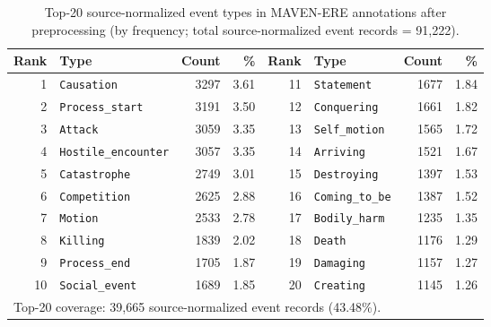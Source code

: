 \documentclass{article}
\begin{document}
\begin{table}[t]
\centering
\caption{Top-20 source-normalized event types in MAVEN-ERE annotations after preprocessing (by frequency; total source-normalized event records = 91{,}222).}
\label{tab:app_mavenere_top20_event_types}
\small
\begin{adjustbox}{max width=\linewidth}
\begin{tabular}{r l r r | r l r r}
\hline
Rank & Type & Count & \% & Rank & Type & Count & \% \\
\hline
1  & \texttt{Causation}            & 3297 & 3.61 & 11 & \texttt{Statement}            & 1677 & 1.84 \\
2  & \texttt{Process\_start}       & 3191 & 3.50 & 12 & \texttt{Conquering}           & 1661 & 1.82 \\
3  & \texttt{Attack}               & 3059 & 3.35 & 13 & \texttt{Self\_motion}         & 1565 & 1.72 \\
4  & \texttt{Hostile\_encounter}   & 3057 & 3.35 & 14 & \texttt{Arriving}             & 1521 & 1.67 \\
5  & \texttt{Catastrophe}          & 2749 & 3.01 & 15 & \texttt{Destroying}           & 1397 & 1.53 \\
6  & \texttt{Competition}          & 2625 & 2.88 & 16 & \texttt{Coming\_to\_be}        & 1387 & 1.52 \\
7  & \texttt{Motion}               & 2533 & 2.78 & 17 & \texttt{Bodily\_harm}          & 1235 & 1.35 \\
8  & \texttt{Killing}              & 1839 & 2.02 & 18 & \texttt{Death}                & 1176 & 1.29 \\
9  & \texttt{Process\_end}         & 1705 & 1.87 & 19 & \texttt{Damaging}             & 1157 & 1.27 \\
10 & \texttt{Social\_event}        & 1689 & 1.85 & 20 & \texttt{Creating}             & 1145 & 1.26 \\
\hline
\multicolumn{8}{l}{Top-20 coverage: 39{,}665 source-normalized event records (43.48\%).} \\
\hline
\end{tabular}
\end{adjustbox}
\end{table}
\end{document}
